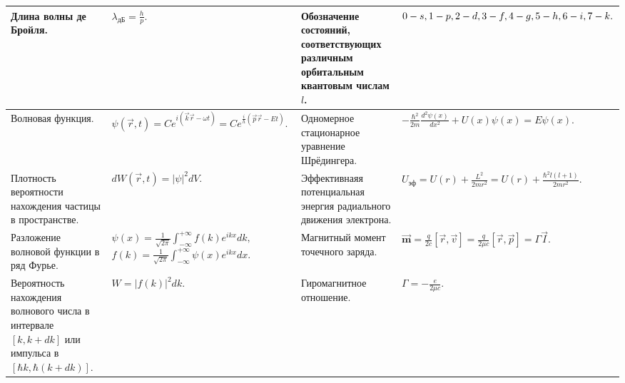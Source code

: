 \documentclass{article}
\begin{document}
\begin{tabular}{ |p{5cm}|p{4.5cm}|p{5cm}|p{4.5cm}|  }
\hline
Длина волны де Бройля.                                                       &  %
$\lambda_{\text{дБ}} = \frac{h}{p}.$                                         &  %
Обозначение состояний, соответствующих различным орбитальным квантовым 
числам $l$.                                                                  &  %
$0-s, 1-p, 2-d, 3-f, \newline 4-g, 5-h, 6-i, 7-k.$                           \\ %
\hline
Волновая функция.                                                            &  %
$
\psi(\vec{r}, t) = Ce^{i(\vec{k}\vec{r} - \omega t)}
= Ce^{\frac{i}{h}(\vec{p}\vec{r} - E t)}.
$                                                                            &  %
Одномерное стационарное уравнение Шрёдингера.                                &  %
$-\frac{\hbar^2}{2m} \frac{d^2 \psi (x)}{dx^2} + U(x)\psi(x) = E\psi(x).$    \\ %
\hline
Плотность вероятности нахождения частицы в пространстве.                     &  %
$dW(\vec{r}, t) = |\psi|^2 dV.$                                              &  %
Эффективнаяя потенциальная энергия радиального движения электрона.           &  %
$
U_\text{эф} = U(r) + \frac{L^2}{2mr^2} = U(r) + \frac{\hbar^2 l(l+1)}{2mr^2}.
$                                                                            \\ %
\hline
Разложение волновой функции в ряд Фурье.                                     &  %
$
\psi(x) = \frac{1}{\sqrt{2 \pi}} \int_{-\infty}^{+\infty} f(k) e^{ikx} dk,
$
$
f(k) = \frac{1}{\sqrt{2 \pi}} \int_{-\infty}^{+\infty} \psi(x) e^{ikx} dx.
$                                                                            &  %
Магнитный момент точечного заряда.                                           &  %
$
\vec{\pmb{m}} = \frac{q}{2c} \left[ \vec{r}, \vec{v} \right] = 
\frac{q}{2\mu c} \left[ \vec{r}, \vec{p} \right] = 
\Gamma \vec{I}.
$                                                                            \\ %
\hline
Вероятность нахождения волнового числа в интервале 
$\left[ k, k + dk \right]$ или импульса в 
$\left[ \hbar k, \hbar(k + dk) \right]$.                                     &  %
$W = |f(k)|^2 dk.$                                                           &  %
Гиромагнитное отношение.                                                     &  %
$\Gamma = - \frac{e}{2\mu c}.$                                               \\ %

\end{tabular}
\end{document}
